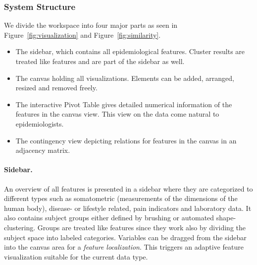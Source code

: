 \documentclass[journal]{style/vgtc} 			          %
\begin{document}
\subsubsection{System Structure} \label{Structure and Workflow}
We divide the workspace into four major parts as seen in Figure~\ref{fig:visualization} and Figure~\ref{fig:similarity}.
\begin{itemize}
	\item The sidebar, which contains all epidemiological features. Cluster results are treated like features and are part of the sidebar as well.
	\item The canvas holding all visualizations. Elements can be added, arranged, resized and removed freely.
	\item The interactive Pivot Table gives detailed numerical information of the features in the canvas view. This view on the data come natural to epidemiologists.
	\item The contingency view depicting relations for features in the canvas in an adjacency matrix.
\end{itemize}
%
% 
% 

\paragraph{Sidebar.}
An overview of all features is presented in a sidebar where they are categorized to different types such as somatometric (measurements of the dimensions of the human body), disease- or lifestyle related, pain indicators and laboratory data.
%
It also contains subject groups either defined by brushing or automated shape-clustering.
%
Groups are treated like features since they work also by dividing the subject space into labeled categories.
%
Variables can be dragged from the sidebar into the canvas area for a \emph{feature localization}.
%
This triggers an adaptive feature visualization suitable for the current data type.
\end{document}
